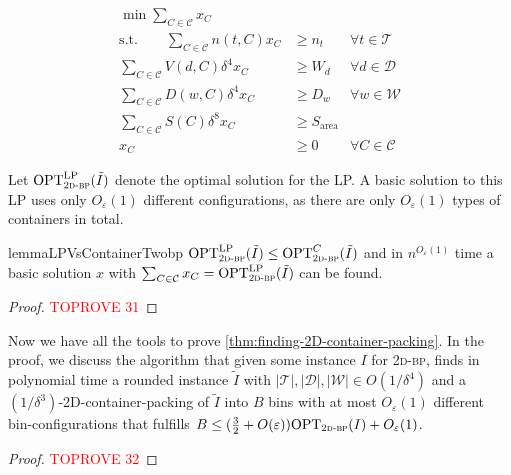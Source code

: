 \documentclass[a4paper,UKenglish,cleveref, autoref, thm-restate]{lipics-v2021}
\newcommand{\eps}{\varepsilon}
\newcommand{\opt}{\mathrm{OPT}}
\newcommand{\twobp}{\textsc{2d-bp}\xspace}
\newcommand{\area}{\mathrm{area}}
\begin{document}
\begin{align*}
    \min \sum_{C \in \mathcal{C}} x_C\\
    \text{s.t.} \quad \quad \sum_{C \in \mathcal{C}} n(t,C)x_C &\geq  n_t &\forall t \in \mathcal{T}\\
     \sum_{C \in \mathcal{C}} V(d,C)\delta^4x_C &\geq  W_d &\forall d \in \mathcal{D}\\
    \sum_{C \in \mathcal{C}} D(w,C)\delta^4x_C &\geq  D_w &\forall w \in \mathcal{W}\\
    \sum_{C \in \mathcal{C}} S(C)\delta^8x_C &\geq  S_{\area}\\
    x_C &\geq 0 &\forall C \in \mathcal{C}
\end{align*}



Let $\opt_{\twobp}^{\text{LP}}(\tilde{I})$ denote the optimal solution for the LP. 
A basic solution to this LP uses only $O_{\eps}(1)$ different configurations, as there are only $O_{\eps}(1)$  types of containers in total.

\begin{restatable}{lemma}{LPVsContainerTwobp}
\label{lem::LP-vs-container-twobp}
$\opt_{\twobp}^{\text{LP}}(\tilde{I}) \leq \opt_{\twobp}^{C}(\tilde{I})$ and in $n^{O_{\eps}(1)}$ time a basic solution $x$ with  $\sum_{C \in \mathcal{C}} x_C = \opt_{\twobp}^{\text{LP}}(\tilde{I})$ can be found.
\end{restatable}

\begin{proof}\textcolor{red}{TOPROVE 31}\end{proof}

Now we have all the tools to prove \cref{thm:finding-2D-container-packing}.
In the proof, we discuss the algorithm that 
given some instance $I$ for \twobp, finds in polynomial time a rounded instance $\tilde{I}$ with $|\mathcal{T}|, |\mathcal{D}|, |\mathcal{W}| \in O(1/\delta^4)$ and a $(1/\delta^3)$-2D-container-packing of $\tilde{I}$ into $B$ bins with at most $O_{\eps}(1)$ different bin-configurations that fulfills $B \leq (\frac{3}{2}+O(\eps))\opt_{\twobp}(I) +O_{\eps}(1)$.



\begin{proof}\textcolor{red}{TOPROVE 32}\end{proof}
\end{document}
